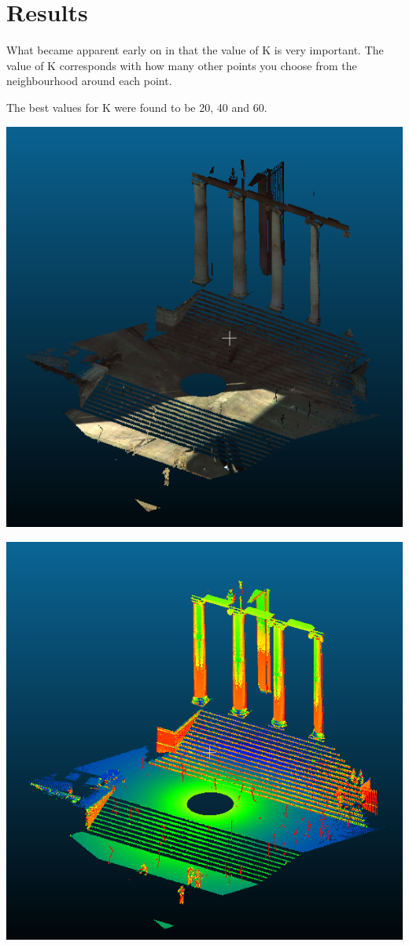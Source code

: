 \documentclass[11pt,a4paper]{article}
\begin{document}
	\section{Results}
	What became apparent early on in that the value of K is very important. The value of K corresponds with how many other points you choose from the neighbourhood around each point.
	
	The best values for K were found to be 20, 40 and 60.
	
	\begin{minipage}{0.9\textwidth}
	\begin{minipage}{.5\textwidth}
		
		\includegraphics[width=0.8\linewidth]{./Before}
		\label{fig:Before}

	\end{minipage}%
	\begin{minipage}{.5\textwidth}
		
		\includegraphics[width=0.8\linewidth]{./Anglek=20}
		\label{fig:Angleformvertk=20}
	\end{minipage}
	

\end{minipage}
\end{document}
